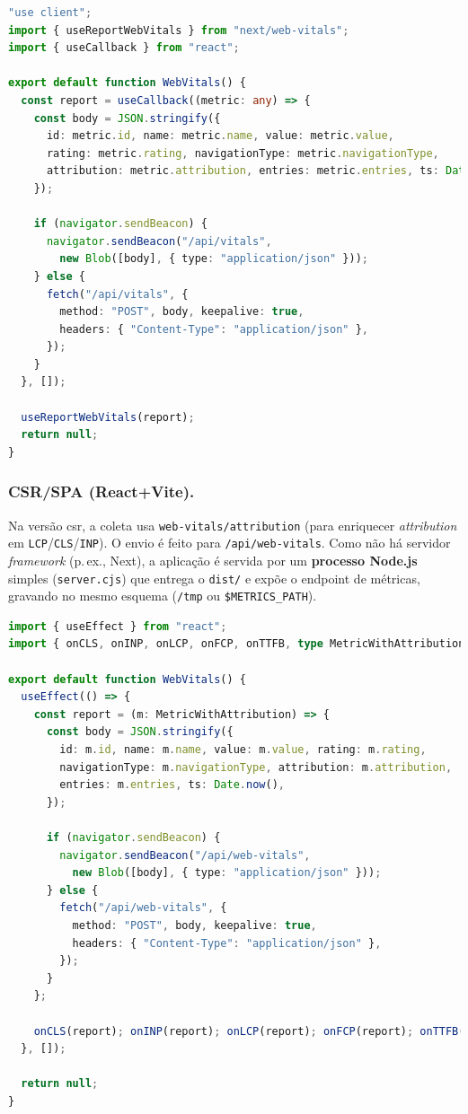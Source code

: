 \begin{lstlisting}[language=TypeScript,caption={Envio de métricas no cliente (SSR/Next.js)}]
"use client";
import { useReportWebVitals } from "next/web-vitals";
import { useCallback } from "react";

export default function WebVitals() {
  const report = useCallback((metric: any) => {
    const body = JSON.stringify({
      id: metric.id, name: metric.name, value: metric.value,
      rating: metric.rating, navigationType: metric.navigationType,
      attribution: metric.attribution, entries: metric.entries, ts: Date.now(),
    });

    if (navigator.sendBeacon) {
      navigator.sendBeacon("/api/vitals",
        new Blob([body], { type: "application/json" }));
    } else {
      fetch("/api/vitals", {
        method: "POST", body, keepalive: true,
        headers: { "Content-Type": "application/json" },
      });
    }
  }, []);

  useReportWebVitals(report);
  return null;
}
\end{lstlisting}

\subsubsection{CSR/SPA (React+Vite).}
Na versão \acrshort{csr}, a coleta usa \texttt{web-vitals/attribution} (para enriquecer \textit{attribution} em \texttt{LCP}/\texttt{CLS}/\texttt{INP}). O envio é feito para \texttt{/api/web-vitals}. Como não há servidor \textit{framework} (p.\,ex., Next), a aplicação é servida por um \textbf{processo Node.js} simples (\texttt{server.cjs}) que entrega o \texttt{dist/} e expõe o endpoint de métricas, gravando no mesmo esquema (\texttt{/tmp} ou \texttt{\$METRICS\_PATH}).

\begin{lstlisting}[language=TypeScript,caption={Envio de métricas no cliente (CSR/React+Vite)}]
import { useEffect } from "react";
import { onCLS, onINP, onLCP, onFCP, onTTFB, type MetricWithAttribution } from "web-vitals/attribution";

export default function WebVitals() {
  useEffect(() => {
    const report = (m: MetricWithAttribution) => {
      const body = JSON.stringify({
        id: m.id, name: m.name, value: m.value, rating: m.rating,
        navigationType: m.navigationType, attribution: m.attribution,
        entries: m.entries, ts: Date.now(),
      });

      if (navigator.sendBeacon) {
        navigator.sendBeacon("/api/web-vitals",
          new Blob([body], { type: "application/json" }));
      } else {
        fetch("/api/web-vitals", {
          method: "POST", body, keepalive: true,
          headers: { "Content-Type": "application/json" },
        });
      }
    };

    onCLS(report); onINP(report); onLCP(report); onFCP(report); onTTFB(report);
  }, []);

  return null;
}
\end{lstlisting}

